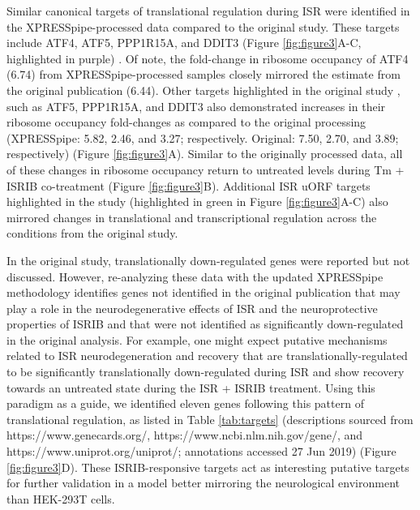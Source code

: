 \documentclass[10pt, oneside]{article}
\begin{document}
Similar canonical targets of translational regulation during ISR were identified in the XPRESSpipe-processed data compared to the original study. These targets include ATF4, ATF5, PPP1R15A, and DDIT3 (Figure \ref{fig:figure3}A-C, highlighted in purple) \cite{isrib_riboseq}. Of note, the fold-change in ribosome occupancy of ATF4 (6.74) from XPRESSpipe-processed samples closely mirrored the estimate from the original publication (6.44). Other targets highlighted in the original study \cite{isrib_riboseq}, such as ATF5, PPP1R15A, and DDIT3 also demonstrated increases in their ribosome occupancy fold-changes as compared to the original processing (XPRESSpipe: 5.82, 2.46, and 3.27; respectively. Original: 7.50, 2.70, and 3.89; respectively) (Figure \ref{fig:figure3}A). Similar to the originally processed data, all of these changes in ribosome occupancy return to untreated levels during Tm + ISRIB co-treatment (Figure \ref{fig:figure3}B). Additional ISR uORF targets highlighted in the study (highlighted in green in Figure \ref{fig:figure3}A-C) also mirrored changes in translational and transcriptional regulation across the conditions from the original study. \par

In the original study, translationally down-regulated genes were reported but not discussed. However, re-analyzing these data with the updated XPRESSpipe methodology identifies genes not identified in the original publication that may play a role in the neurodegenerative effects of ISR and the neuroprotective properties of ISRIB \cite{isrib_neuroprotective,isrib_neuroprotective2,isrib_neuroprotective3,isrib_neuroprotective4} and that were not identified as significantly down-regulated in the original analysis. For example, one might expect putative mechanisms related to ISR neurodegeneration and recovery that are translationally-regulated to be significantly translationally down-regulated during ISR and show recovery towards an untreated state during the ISR + ISRIB treatment. Using this paradigm as a guide, we identified eleven genes following this pattern of translational regulation, as listed in Table \ref{tab:targets} (descriptions sourced from https://www.genecards.org/, https://www.ncbi.nlm.nih.gov/gene/, and https://www.uniprot.org/uniprot/; annotations accessed 27 Jun 2019) (Figure \ref{fig:figure3}D). These ISRIB-responsive targets act as interesting putative targets for further validation in a model better mirroring the neurological environment than HEK-293T cells.
\end{document}
